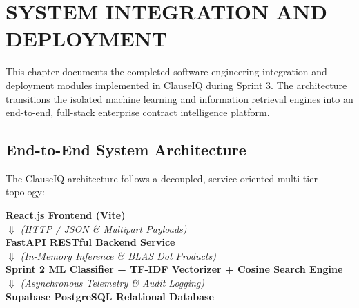 \chapter{SYSTEM INTEGRATION AND DEPLOYMENT}
\label{ch:current_implementation_status}

This chapter documents the completed software engineering integration and deployment modules implemented in ClauseIQ during Sprint 3. The architecture transitions the isolated machine learning and information retrieval engines into an end-to-end, full-stack enterprise contract intelligence platform.

\section{End-to-End System Architecture}
\label{sec:system_architecture}

The ClauseIQ architecture follows a decoupled, service-oriented multi-tier topology:

\begin{center}
\textbf{React.js Frontend (Vite)} \\
$\Downarrow$ \textit{(HTTP / JSON \& Multipart Payloads)} \\
\textbf{FastAPI RESTful Backend Service} \\
$\Downarrow$ \textit{(In-Memory Inference \& BLAS Dot Products)} \\
\textbf{Sprint 2 ML Classifier + TF-IDF Vectorizer + Cosine Search Engine} \\
$\Downarrow$ \textit{(Asynchronous Telemetry \& Audit Logging)} \\
\textbf{Supabase PostgreSQL Relational Database}
\end{center}

